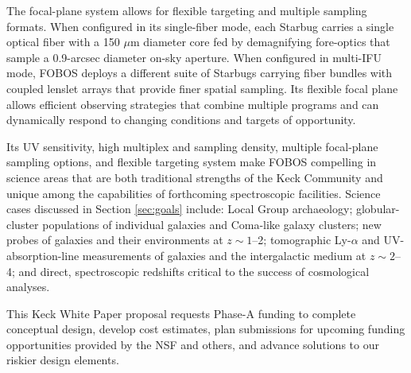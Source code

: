 The focal-plane system allows for flexible targeting
and multiple sampling formats. When configured in its single-fiber
mode, each Starbug carries a single optical fiber with a 150 $\mu$m
diameter core fed by demagnifying fore-optics that sample a
0.9-arcsec diameter on-sky aperture. When configured in multi-IFU
mode, FOBOS deploys a different suite of Starbugs carrying fiber
bundles with coupled lenslet arrays that provide finer spatial
sampling. Its flexible focal plane allows efficient observing
strategies that combine multiple programs and can dynamically respond
to changing conditions and targets of opportunity.


Its UV sensitivity, high multiplex and sampling density, multiple
focal-plane sampling options, and flexible targeting system make
FOBOS compelling in science areas that are both traditional strengths
of the Keck Community and unique among the capabilities of
forthcoming spectroscopic facilities. Science cases discussed in
Section \ref{sec:goals} include: Local Group archaeology;
globular-cluster populations of individual galaxies and Coma-like
galaxy clusters; new probes of galaxies and their environments at $z
\sim 1$--2; tomographic Ly-$\alpha$ and UV-absorption-line
measurements of galaxies and the intergalactic medium at $z \sim
2$--4; and direct, spectroscopic redshifts critical to the success of
cosmological analyses.

This Keck White Paper proposal requests Phase-A funding to complete
conceptual design, develop cost estimates, plan submissions for
upcoming funding opportunities provided by the NSF and others, and
advance solutions to our riskier design elements.




